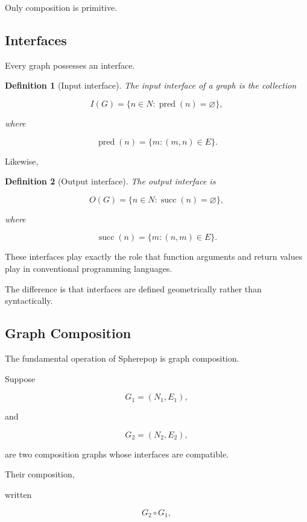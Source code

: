 \documentclass[12pt,oneside]{article}
\newtheorem{definition}{Definition}[section]
\begin{document}
Only composition is primitive.

\subsection{Interfaces}

Every graph possesses an interface.

\begin{definition}[Input interface]

The input interface of a graph is the collection

\[
I(G)
=
\{n\in N
:
\operatorname{pred}(n)=\varnothing
\},
\]

where

\[
\operatorname{pred}(n)
=
\{m:(m,n)\in E\}.
\]

\end{definition}

Likewise,

\begin{definition}[Output interface]

The output interface is

\[
O(G)
=
\{n\in N
:
\operatorname{succ}(n)=\varnothing
\},
\]

where

\[
\operatorname{succ}(n)
=
\{m:(n,m)\in E\}.
\]

\end{definition}

These interfaces play exactly the role that function arguments and return values play in conventional programming languages.

The difference is that interfaces are defined geometrically rather than syntactically.

\subsection{Graph Composition}

The fundamental operation of Spherepop is graph composition.

Suppose

\[
G_1
=
(N_1,E_1),
\]

and

\[
G_2
=
(N_2,E_2),
\]

are two composition graphs whose interfaces are compatible.

Their composition,

written

\[
G_2\circ G_1,
\]
\end{document}
